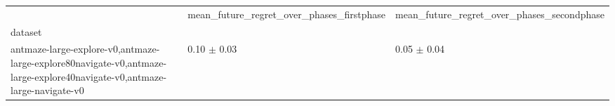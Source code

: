 \begin{tabular}{lll}
\toprule
 & mean_future_regret_over_phases_firstphase & mean_future_regret_over_phases_secondphase \\
dataset &  &  \\
\midrule
antmaze-large-explore-v0,antmaze-large-explore80navigate-v0,antmaze-large-explore40navigate-v0,antmaze-large-navigate-v0 & 0.10 $\pm$ 0.03 & 0.05 $\pm$ 0.04 \\
\bottomrule
\end{tabular}
